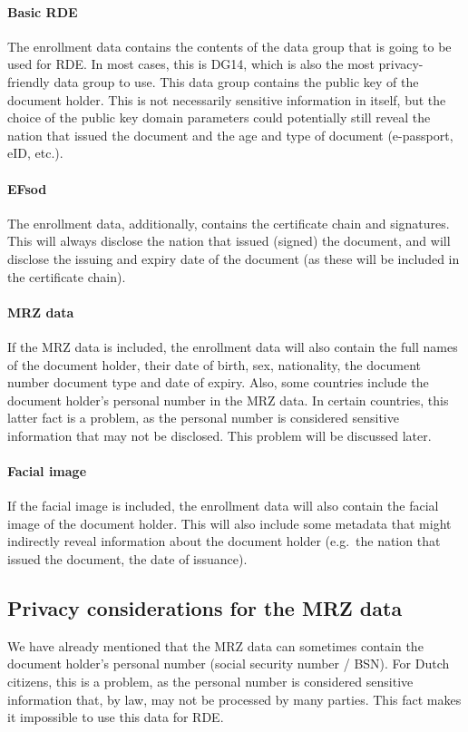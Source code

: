 \paragraph{Basic RDE}
The enrollment data contains the contents of the data group that is going to be used for RDE.
In most cases, this is DG14, which is also the most privacy-friendly data group to use.
This data group contains the public key of the document holder.
This is not necessarily sensitive information in itself, but the choice of the public key domain parameters could potentially still reveal the nation that issued the document and the age and type of document (e-passport, eID, etc.).

\paragraph{EFsod}
The enrollment data, additionally, contains the certificate chain and signatures.
This will always disclose the nation that issued (signed) the document, and will disclose the issuing and expiry date of the document (as these will be included in the certificate chain).

\paragraph{MRZ data}
If the MRZ data is included, the enrollment data will also contain the full names of the document holder, their date of birth, sex, nationality, the document number document type and date of expiry.
Also, some countries include the document holder's personal number in the MRZ data.
In certain countries, this latter fact is a problem, as the personal number is considered sensitive information that may not be disclosed.
This problem will be discussed later.

\paragraph{Facial image}
If the facial image is included, the enrollment data will also contain the facial image of the document holder.
This will also include some metadata that might indirectly reveal information about the document holder (e.g.\ the nation that issued the document, the date of issuance).

\subsection{Privacy considerations for the MRZ data}\label{subsec:privacy-considerations-for-the-mrz-data}
We have already mentioned that the MRZ data can sometimes contain the document holder's personal number (social security number / BSN).
For Dutch citizens, this is a problem, as the personal number is considered sensitive information that, by law, may not be processed by many parties.
This fact makes it impossible to use this data for RDE.


